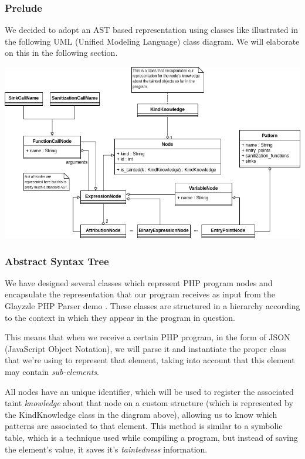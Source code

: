 \documentclass[10pt,onecolumn,a4paper]{article}
\begin{document}
	\subsubsection{Prelude}
		\hspace{3.5mm} We decided to adopt an AST based representation using classes like illustrated in the following UML (Unified Modeling Language) class diagram. We will elaborate on this in the following section. 
		\begin{center}
			\includegraphics[width=\columnwidth]{uml.png}
		\end{center}
		
	\pagebreak
	\subsubsection{Abstract Syntax Tree}
\hspace{3.5mm} We have designed several classes which represent PHP program nodes and encapsulate the representation that our program receives as input from the Glayzzle PHP Parser demo \cite{PARSERDEMO}.
These classes are structured in a hierarchy according to the context in which they appear in the program in question. 

This means that when we receive a certain PHP program, in the form of JSON (JavaScript Object Notation), we will parse it and instantiate the proper class that we're using to represent that element, taking into account that this element may contain  \emph{sub-elements}.

All nodes have an unique identifier, which will be used to register the associated taint \emph{knowledge} about that node on a custom structure (which is represented by the KindKnowledge class in the diagram above), allowing us to know which patterns are associated to that element. This method is similar to a symbolic table, which is a technique used while compiling a program, but instead of saving the element’s value, it saves it's \emph{taintedness} information.
\end{document}
